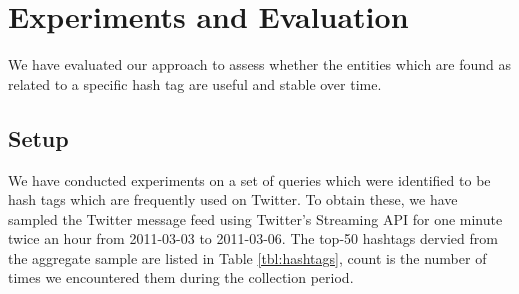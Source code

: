 \documentclass{llncs}
\begin{document}
\section{Experiments and Evaluation}
\label{sect:eval}

We have evaluated our approach to assess whether the entities which are found as related to a specific hash tag are useful and stable over time.

\subsection{Setup}

We have conducted experiments on a set of queries which were identified to be hash tags which are frequently used on Twitter.
To obtain these, we have sampled the Twitter message feed using Twitter's
Streaming API for one minute twice an hour from 2011-03-03 to 2011-03-06. The
top-50 hashtags dervied from the aggregate sample are listed in Table
\ref{tbl:hashtags}, count is the number of times we encountered them during the
collection period.
\end{document}
